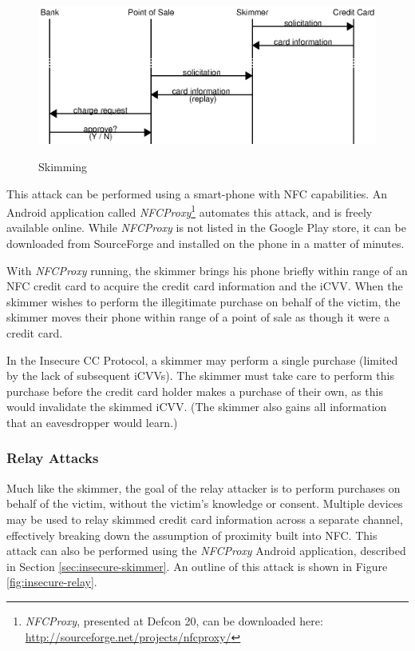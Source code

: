 \begin{figure}
  \caption{Skimming}
  \centering
    \includegraphics{img/attack-3-skim.eps}
  \label{fig:insecure-skimmer}
\end{figure}

This attack can be performed using a smart-phone with NFC capabilities.
An Android application called \emph{NFCProxy}\footnote{\emph{NFCProxy}\cite{NFCProxy}, presented at Defcon 20, can be downloaded here: \url{http://sourceforge.net/projects/nfcproxy/}} automates this attack, and is freely available online.
While \emph{NFCProxy} is not listed in the Google Play store, it can be downloaded from SourceForge and installed on the phone in a matter of minutes.

With \emph{NFCProxy} running, the skimmer brings his phone briefly within range of an NFC credit card to acquire the credit card information and  the iCVV.
When the skimmer wishes to perform the illegitimate purchase on behalf of the victim, the skimmer moves their phone within range of a point of sale as though it were a credit card.

In the Insecure CC Protocol, a skimmer may perform a single purchase (limited by the lack of subsequent iCVVs).
The skimmer must take care to perform this purchase before the credit card holder makes a purchase of their own, as this would invalidate the skimmed iCVV.
(The skimmer also gains all information that an eavesdropper would learn.)






\subsubsection{Relay Attacks}
\label{sec:insecure-relay}

Much like the skimmer, the goal of the relay attacker is to perform purchases on behalf of the victim, without the victim's knowledge or consent.
Multiple devices may be used to relay skimmed credit card information across a separate channel, effectively breaking down the assumption of proximity built into NFC.
This attack can also be performed using the \emph{NFCProxy} Android application, described in Section \ref{sec:insecure-skimmer}.
An outline of this attack is shown in Figure \ref{fig:insecure-relay}.


